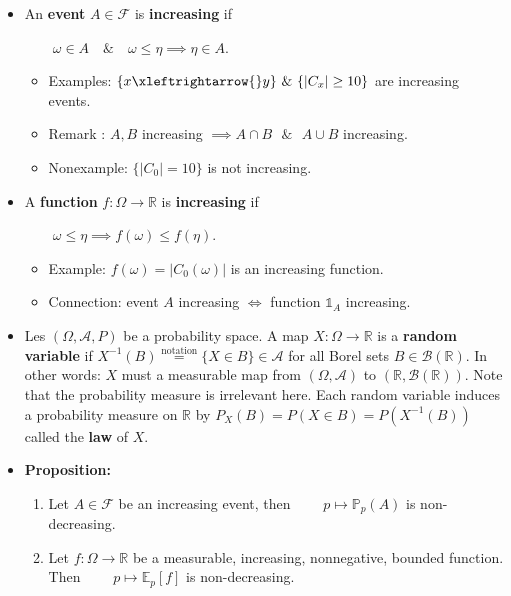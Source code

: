 \documentclass[
  letterpaper,
  DIV=11,
  numbers=noendperiod]{scrartcl}
\providecommand{\tightlist}{%
  \setlength{\itemsep}{0pt}\setlength{\parskip}{0pt}}\usepackage{longtable,booktabs,array}
\begin{document}
\begin{itemize}
\item
  An \textbf{event} \(A \in \mathcal{F}\) is \textbf{increasing} if

  \(\qquad \omega \in A \quad \& \quad \omega \leq \eta \implies \eta \in A.\)

  \begin{itemize}
  \item
    Examples:
    \(\{x \xleftrightarrow{} y\} \text{ } \& \text{ } \{|C_x| \geq 10\}\)
    are increasing events.
  \item
    Remark : \(A, B\) increasing
    \(\implies A \cap B \text{ } \& \text{ } A \cup B\) increasing.
  \item
    Nonexample: \(\{|C_0| = 10\}\) is not increasing.
  \end{itemize}
\item
  A \textbf{function} \(f: \Omega \to \mathbb{R}\) is
  \textbf{increasing} if

  \(\qquad \omega \leq \eta \implies f(\omega) \leq f(\eta).\)

  \begin{itemize}
  \item
    Example: \(f(\omega) = |C_0(\omega)|\) is an increasing function.
  \item
    Connection: event \(A\) increasing \(\iff\) function
    \(\mathbb{1}_A\) increasing.
  \end{itemize}
\item
  Les \((\Omega, \mathcal{A}, P)\) be a probability space. A map
  \(X: \Omega \to \mathbb{R}\) is a \textbf{random variable} if
  \(X^{-1}(B) \stackrel{\text{notation}}{=} \{X \in B\} \in \mathcal{A}\)
  for all Borel sets \(B \in \mathcal{B}(\mathbb{R})\). In other words:
  \(X\) must a measurable map from \((\Omega, \mathcal{A})\) to
  \((\mathbb{R}, \mathcal{B}(\mathbb{R}))\). Note that the probability
  measure is irrelevant here. Each random variable induces a probability
  measure on \(\mathbb{R}\) by \(P_X(B) = P(X \in B) = P(X^{-1}(B))\)
  called the \textbf{law} of \(X\).
\item
  \textbf{Proposition:}

  \begin{enumerate}
  \def\labelenumi{\arabic{enumi}.}
  \tightlist
  \item
    Let \(A \in \mathcal{F}\) be an increasing event, then
    \(\qquad p \mapsto \mathbb{P}_p(A)\) is non-decreasing.
  \item
    Let \(f: \Omega \to \mathbb{R}\) be a measurable, increasing,
    nonnegative, bounded function. Then
    \(\qquad p \mapsto \mathbb{E}_p[f]\) is non-decreasing.
  \end{enumerate}


\end{itemize}
\end{document}
